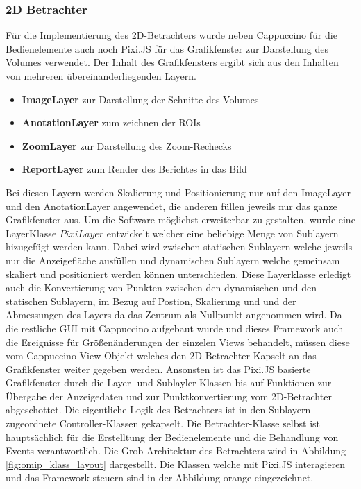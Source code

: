 \subsubsection{2D Betrachter}
\label{sec:2D Betrachter}
Für die Implementierung des 2D-Betrachters wurde neben Cappuccino für die Bedienelemente auch noch Pixi.JS für das Grafikfenster zur Darstellung des Volumes verwendet.
Der Inhalt des Grafikfensters ergibt sich aus den Inhalten von mehreren übereinanderliegenden Layern.
\begin{itemize}
	\item \textbf{ImageLayer} zur Darstellung der Schnitte des Volumes
	\item \textbf{AnotationLayer} zum zeichnen der ROIs
	\item \textbf{ZoomLayer} zur Darstellung des Zoom-Rechecks
	\item \textbf{ReportLayer} zum Render des Berichtes in das Bild
\end{itemize}
Bei diesen Layern werden Skalierung und Positionierung nur auf den ImageLayer und den AnotationLayer angewendet, die anderen füllen jeweils nur das ganze Grafikfenster aus.
Um die Software möglichst erweiterbar zu gestalten,
wurde eine LayerKlasse $PixiLayer$ entwickelt welcher eine beliebige Menge von Sublayern hizugefügt werden kann.
Dabei wird zwischen statischen Sublayern welche jeweils nur die Anzeigefläche ausfüllen und dynamischen Sublayern welche gemeinsam skaliert und positioniert werden können unterschieden.
Diese Layerklasse erledigt auch die Konvertierung von Punkten zwischen den dynamischen und den statischen Sublayern, im Bezug auf Postion, Skalierung und und der Abmessungen des Layers da das Zentrum als Nullpunkt angenommen wird.
Da die restliche GUI mit Cappuccino aufgebaut wurde und dieses Framework auch die Ereignisse für Größenänderungen der einzelen Views behandelt,
müssen diese vom Cappuccino View-Objekt welches den 2D-Betrachter Kapselt an das Grafikfenster weiter gegeben werden.
Ansonsten ist das Pixi.JS basierte Grafikfenster durch die Layer- und Sublayler-Klassen bis auf Funktionen zur Übergabe der Anzeigedaten und zur Punktkonvertierung vom 2D-Betrachter abgeschottet.
Die eigentliche Logik des Betrachters ist in den Sublayern zugeordnete Controller-Klassen gekapselt.
Die Betrachter-Klasse selbst ist hauptsächlich für die Erstelltung der Bedienelemente und die Behandlung von Events verantwortlich.
Die Grob-Architektur des Betrachters wird in Abbildung \ref{fig:omip_klass_layout} dargestellt.
Die Klassen welche mit Pixi.JS interagieren und das Framework steuern sind in der Abbildung orange eingezeichnet.
